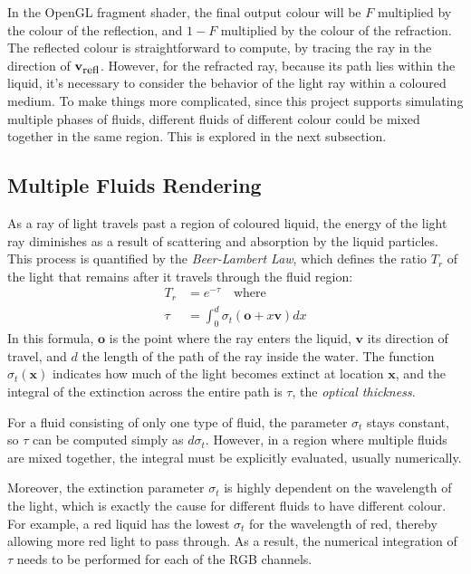 In the OpenGL fragment shader, the final output colour will be $F$ multiplied by the colour of the reflection, and $1-F$ multiplied by the colour of the refraction. The reflected colour is straightforward to compute, by tracing the ray in the direction of $\textbf{v}_{\mbox{\small{refl}}}$. However, for the refracted ray, because its path lies within the liquid, it's necessary to consider the behavior of the light ray within a coloured medium. To make things more complicated, since this project supports simulating multiple phases of fluids, different fluids of different colour could be mixed together in the same region. This is explored in the next subsection.

\subsection{Multiple Fluids Rendering}
\label{subsection multiphase render}
As a ray of light travels past a region of coloured liquid, the energy of the light ray diminishes as a result of scattering and absorption by the liquid particles. This process is quantified by the \textit{Beer-Lambert Law}, which defines the ratio $T_r$ of the light that remains after it travels through the fluid region:
\begin{equation*}
    \begin{aligned}
        T_r &= e^{-\tau} \mbox{~~~where}\\
        \tau &= \int_0^{d} \sigma_t(\textbf{o}+x\textbf{v}) dx
    \end{aligned}
\end{equation*}
In this formula, $\textbf{o}$ is the point where the ray enters the liquid, $\textbf{v}$ its direction of travel, and $d$ the length of the path of the ray inside the water. The function $\sigma_t(\textbf{x})$ indicates how much of the light becomes extinct at location $\textbf{x}$, and the integral of the extinction across the entire path is $\tau$, the \textit{optical thickness}.

For a fluid consisting of only one type of fluid, the parameter $\sigma_t$ stays constant, so $\tau$ can be computed simply as $d\sigma_t$. However, in a region where multiple fluids are mixed together, the integral must be explicitly evaluated, usually numerically.

Moreover, the extinction parameter $\sigma_t$ is highly dependent on the wavelength of the light, which is exactly the cause for different fluids to have different colour. For example, a red liquid has the lowest $\sigma_t$ for the wavelength of red, thereby allowing more red light to pass through. As a result, the numerical integration of $\tau$ needs to be performed for each of the RGB channels.

